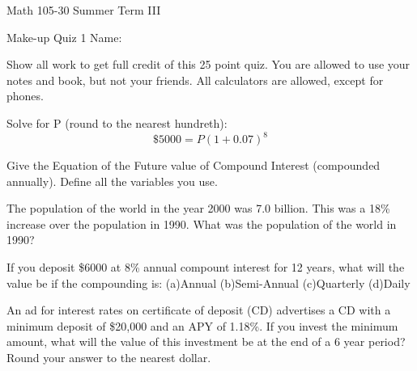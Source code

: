 \documentclass[11pt,epsfig]{article}
\begin{document}
Math 105-30 Summer Term III 

Make-up Quiz 1 \hspace{1.9in} {Name:} {\underline {\hspace{2.5in}}}
\vspace{2pc}

Show all work to get full credit of this 25 point quiz. You are allowed to use your notes and book, but not your friends. All calculators are allowed, except for phones.
\vspace{2pc}

\begin{problem}{5}
Solve for P (round to the nearest hundreth):
\begin{equation}
\$ 5000=P(1+0.07)^{8}
\end{equation}
\vfill
\end{problem}

\begin{problem}{4}
Give the Equation of the Future value of Compound Interest (compounded annually). Define all the variables you use. 
\vfill
\end{problem}

\begin{problem}{5}
The population of the world in the year 2000 was 7.0 billion. This was a 18\%
increase over the population in 1990. What was the population of the world in 1990?
\vfill
\end{problem}

\newpage

\begin{problem}{6}
If you deposit \$6000 at 8\% annual compount interest for 12 years, what will the value be if the compounding is:
\newline(a)Annual
\newline(b)Semi-Annual
\newline(c)Quarterly
\newline(d)Daily
\vfill
\end{problem}

\begin{problem}{5}
An ad for interest rates on certificate of deposit (CD) advertises a CD with a minimum deposit of \$20,000 and an APY of 1.18\%. 
If you invest the minimum amount, what will the value of this investment be at the end of a 6 year period? Round your answer to the nearest dollar. 
\vfill
\end{problem}

\showpoints
\end{document}
